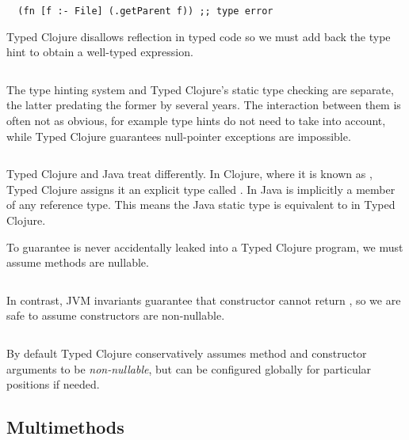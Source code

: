 \begin{verbatim}
  (fn [f :- File] (.getParent f)) ;; type error
\end{verbatim}

Typed Clojure disallows reflection in typed code
so we must add back the type hint to obtain a well-typed
expression.

\inputminted[firstline=10,lastline=10]{clojure}{code/demo/src/demo/parent3.clj}

The type hinting system and Typed Clojure's static type checking
are separate, the latter predating the former by several years.
The interaction between them is often not as obvious, for example type hints
do not need to take  into account, while Typed Clojure guarantees
null-pointer exceptions are impossible.

\begin{exmp}
\inputminted[firstline=18,lastline=19]{clojure}{code/demo/src/demo/parent3.clj}
\end{exmp}

Typed Clojure and Java treat  differently.
In Clojure, where it is known as , Typed Clojure assigns it an explicit type
called . In Java  is implicitly a member of any reference type.
This means the Java static type  is equivalent to
 in Typed Clojure.

To guarantee  is never accidentally leaked into a Typed Clojure program,
we must assume methods are nullable.

\begin{exmp}
\inputminted[firstline=6,lastline=8]{clojure}{code/demo/src/demo/parent3.clj}
\end{exmp}

In contrast, JVM invariants guarantee that  constructor cannot return ,
so we are safe to assume constructors are non-nullable.

\begin{exmp}
\inputminted[firstline=15,lastline=16]{clojure}{code/demo/src/demo/parent3.clj}
\end{exmp}

By default Typed Clojure conservatively assumes method and constructor arguments to be \emph{non-nullable},
but can be configured globally for particular positions if needed.

\subsection{Multimethods}

